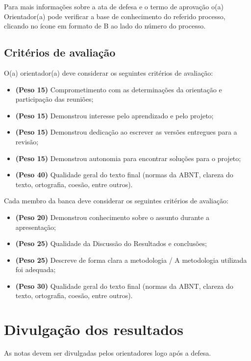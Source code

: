 \documentclass[a4paper, 12pt]{article}
\begin{document}
	Para mais informações sobre a ata de defesa e o termo de aprovação o(a) Orientador(a) pode verificar a base de conhecimento do referido processo, clicando no ícone em formato de B ao lado do número do processo.
	
	\subsection{Critérios de avaliação}
	
	O(a) orientador(a) deve considerar os seguintes critérios de avaliação:
	
	\begin{itemize}
		\item \textbf{(Peso 15)} Comprometimento com as determinações da orientação e participação das reuniões;
		\item \textbf{(Peso 15)} Demonstrou interesse pelo aprendizado e pelo projeto;
		\item \textbf{(Peso 15)} Demonstrou dedicação ao escrever as versões entregues para a revisão;
		\item \textbf{(Peso 15)} Demonstrou autonomia para encontrar soluções para o projeto;
		\item \textbf{(Peso 40)} Qualidade geral do texto final (normas da ABNT, clareza do texto, ortografia, coesão, entre outros).
	\end{itemize}

	Cada membro da banca deve considerar os seguintes critérios de avaliação:
	
	\begin{itemize}
		\item \textbf{(Peso 20)} Demonstrou conhecimento sobre o assunto durante a apresentação;
		\item \textbf{(Peso 25)} Qualidade da Discussão do Resultados e conclusões;
		\item \textbf{(Peso 25)} Descreve de forma clara a metodologia / A metodologia utilizada foi adequada;
		\item \textbf{(Peso 30)} Qualidade geral do texto final (normas da ABNT, clareza do texto, ortografia, coesão, entre outros).
	\end{itemize}

	\section{Divulgação dos resultados}
	
	As notas devem ser divulgadas pelos orientadores logo após a defesa.
	
\end{document}
